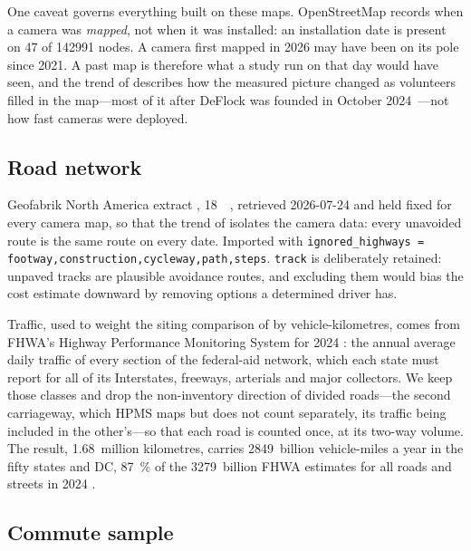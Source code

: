 \documentclass[11pt,twoside]{article}
\begin{document}
One caveat governs everything built on these maps. OpenStreetMap records when a camera was
\emph{mapped}, not when it was installed: an installation date is present on 47 of
\num{142991} nodes. A camera first mapped in 2026 may have been on its pole since 2021. A
past map is therefore what a study run on that day would have seen, and the trend of
 describes how the measured picture changed as volunteers filled
in the map---most of it after DeFlock was founded in October
2024~\citep{deflock}---not how fast cameras were deployed.

\subsection{Road network}
\label{sec:data:roads}

Geofabrik North America extract \citep{geofabrik}, \SI{18}{\giga\byte}, retrieved 2026-07-24 and held
fixed for every camera map, so that the trend of  isolates the
camera data: every unavoided route is the same route on every date. Imported with
\texttt{ignored\_highways = footway,\allowbreak construction,\allowbreak cycleway,\allowbreak path,\allowbreak steps}. \texttt{track} is
deliberately retained: unpaved tracks are plausible avoidance routes, and excluding them
would bias the cost estimate downward by removing options a determined driver has.

Traffic, used to weight the siting comparison of  by
vehicle-kilometres, comes from FHWA's Highway Performance Monitoring System for 2024
\citep{hpms2024}: the annual average daily traffic of every section of the federal-aid
network, which each state must report for all of its Interstates, freeways, arterials and major
collectors. We keep those classes and drop the non-inventory direction of divided roads---the
second carriageway, which HPMS maps but does not count separately, its traffic being included in
the other's---so that each road is counted once, at its two-way volume. The result, \num{1.68}~million kilometres, carries \num{2849}~billion
vehicle-miles a year in the fifty states and DC, \SI{87}{\percent} of the \num{3279}~billion
FHWA estimates for all roads and streets in 2024 \citep{fhwa2025tvt}.

\subsection{Commute sample}
\label{sec:data:commutes}
\end{document}
